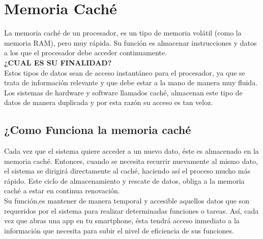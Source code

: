 \section{Memoria Caché}
La memoria caché de un procesador, es un tipo de memoria volátil (como la memoria RAM), pero muy rápida. Su función es almacenar instrucciones y datos a los que el procesador debe acceder continuamente.\\{\bf ¿CUAL ES SU FINALIDAD?}\\Estos tipos de datos sean de acceso instantáneo para el procesador, ya que se trata de información relevante y que debe estar a la mano de manera muy fluida. Los sistemas de hardware y software llamados caché, almacenan este tipo de datos de manera duplicada y por esta razón su acceso es tan veloz.
\subsection{¿Como Funciona la memoria caché}
Cada vez que el sistema quiere acceder a un nuevo dato, éste es almacenado en la memoria caché. Entonces, cuando se necesita recurrir nuevamente al mismo dato, el sistema se dirigirá directamente al caché, haciendo así el proceso mucho más rápido. Este ciclo de almacenamiento y rescate de datos, obliga a la memoria caché a estar en continua renovación.\\Su función,es mantener de manera temporal y accesible aquellos datos que son requeridos por el sistema para realizar determinadas funciones o tareas. Así, cada vez que abras una app en tu smartphone, ésta tendrá acceso inmediato a la información que necesita para subir el nivel de eficiencia de sus funciones.
